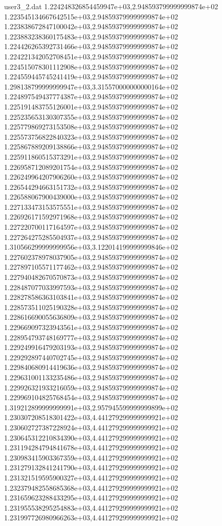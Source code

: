 \begin{filecontents}{user3_2.dat}
1.224248326854459947e+03,2.948593799999999874e+02
1.223545134667642515e+03,2.948593799999999874e+02
1.223838672847100042e+03,2.948593799999999874e+02
1.223883238360175483e+03,2.948593799999999874e+02
1.224426265392731466e+03,2.948593799999999874e+02
1.224221342052708451e+03,2.948593799999999874e+02
1.224515078301112908e+03,2.948593799999999874e+02
1.224559445745241419e+03,2.948593799999999874e+02
1.298138799999999947e+03,3.315570000000000164e+02
1.224897549437774387e+03,2.948593799999999874e+02
1.225191483755126001e+03,2.948593799999999874e+02
1.225235653130307355e+03,2.948593799999999874e+02
1.225779869273153508e+03,2.948593799999999874e+02
1.225573756822840323e+03,2.948593799999999874e+02
1.225867889209138866e+03,2.948593799999999874e+02
1.225911860515373291e+03,2.948593799999999874e+02
1.226958712089201754e+03,2.948593799999999874e+02
1.226249964207906260e+03,2.948593799999999874e+02
1.226544294663151732e+03,2.948593799999999874e+02
1.226588067900439000e+03,2.948593799999999874e+02
1.227133473153575551e+03,2.948593799999999874e+02
1.226926171592971968e+03,2.948593799999999874e+02
1.227220700117164597e+03,2.948593799999999874e+02
1.227264275285504937e+03,2.948593799999999874e+02
1.310566299999999956e+03,3.122014199999999846e+02
1.227602378978037905e+03,2.948593799999999874e+02
1.227897105571177462e+03,2.948593799999999874e+02
1.227940482670570873e+03,2.948593799999999874e+02
1.228487077033997593e+03,2.948593799999999874e+02
1.228278586363103841e+03,2.948593799999999874e+02
1.228573511025190328e+03,2.948593799999999874e+02
1.228616690055636809e+03,2.948593799999999874e+02
1.229669097323943561e+03,2.948593799999999874e+02
1.228954793748169777e+03,2.948593799999999874e+02
1.229249916479203193e+03,2.948593799999999874e+02
1.229292897440702745e+03,2.948593799999999874e+02
1.229840680914419636e+03,2.948593799999999874e+02
1.229631001133235486e+03,2.948593799999999874e+02
1.229926321933216059e+03,2.948593799999999874e+02
1.229969104825768454e+03,2.948593799999999874e+02
1.319212899999999991e+03,2.957945599999999899e+02
1.230307208518301422e+03,4.441279299999999921e+02
1.230602727387228924e+03,4.441279299999999921e+02
1.230645312210834390e+03,4.441279299999999921e+02
1.231194284794841678e+03,4.441279299999999921e+02
1.230983415903367359e+03,4.441279299999999921e+02
1.231279132841241790e+03,4.441279299999999921e+02
1.231321519595900327e+03,4.441279299999999921e+02
1.232379482558685368e+03,4.441279299999999921e+02
1.231659623288433295e+03,4.441279299999999921e+02
1.231955538295254883e+03,4.441279299999999921e+02
1.231997726980966263e+03,4.441279299999999921e+02

\end{filecontents}
